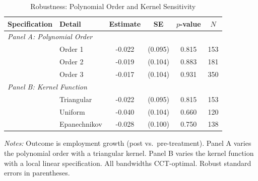 \begin{table}[htbp]
\centering
\caption{Robustness: Polynomial Order and Kernel Sensitivity}
\label{tab:robustness}
\begin{tabular}{llcccc}
\toprule
Specification & Detail & Estimate & SE & $p$-value & $N$ \\
\midrule
\multicolumn{6}{l}{\textit{Panel A: Polynomial Order}} \\
  & Order 1 & -0.022 & (0.095) & 0.815 & 153 \\
  & Order 2 & -0.019 & (0.104) & 0.883 & 181 \\
  & Order 3 & -0.017 & (0.104) & 0.931 & 350 \\
\midrule
\multicolumn{6}{l}{\textit{Panel B: Kernel Function}} \\
  & Triangular & -0.022 & (0.095) & 0.815 & 153 \\
  & Uniform & -0.040 & (0.104) & 0.660 & 120 \\
  & Epanechnikov & -0.028 & (0.100) & 0.750 & 138 \\
\bottomrule
\end{tabular}
\begin{minipage}{0.85\textwidth}
\vspace{0.3em}
\footnotesize \textit{Notes:} Outcome is employment growth (post vs.\ pre-treatment).
Panel A varies the polynomial order with a triangular kernel.
Panel B varies the kernel function with a local linear specification.
All bandwidths CCT-optimal. Robust standard errors in parentheses.
\end{minipage}
\end{table}
